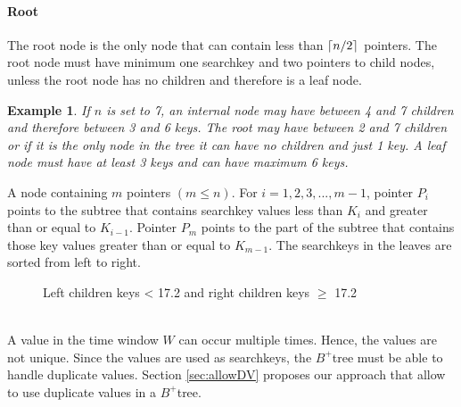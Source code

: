 \documentclass[abstracton,12pt]{scrreprt}
\DeclarePairedDelimiter\ceil{\lceil}{\rceil}
\newtheorem{example}{Example}
\begin{document}
\paragraph{Root}The root node is the only node that can contain less than $\ceil{n/2}$ pointers. The root node must have minimum one searchkey and two pointers to child nodes, unless the root node has no children and therefore is a leaf node.
\begin{example}
	If $n$ is set to 7, an internal node may have between 4 and 7 children and therefore between 3 and 6 keys. The root may have between 2 and 7 children or if it is the only node in the tree it can have no children and just 1 key. A leaf node must have at least 3 keys and can have maximum 6 keys.
\end{example}
A node containing $m$ pointers $\left(m \leq n\right)$. For $i = 1, 2, 3, . . . ,m-1$, pointer $P_i$ points to the subtree that contains searchkey values less than $K_i$ and greater than or equal to $K_{i-1}$. Pointer $P_m$ points to the part of the subtree that contains those key values greater than or equal to $K_{m-1}$. The searchkeys in the leaves are sorted from left to right. 
\begin{figure}[ht!]
	\centering
	\vspace{2mm}
	\caption{Left children keys < 17.2 and right children keys $\geq$ 17.2}
	\label{fig:BTreeBook}
\end{figure} 
\\A value in the time window $W$ can occur multiple times. Hence, the values are not unique. Since the values are used as searchkeys, the $B^+$tree must be able to handle duplicate values. Section \ref{sec:allowDV} proposes our approach that allow to use duplicate values in a $B^+$tree. 
\end{document}
